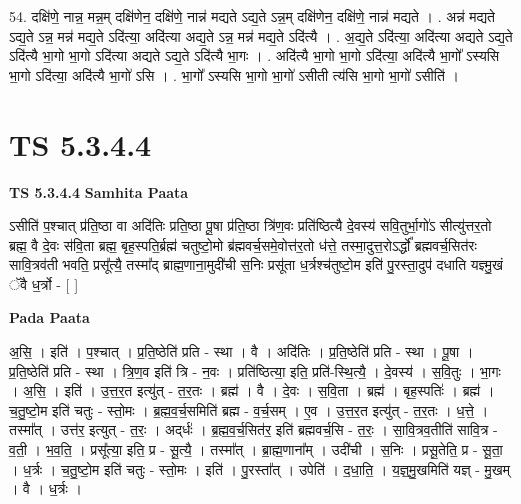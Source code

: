 \documentclass[17pt]{extarticle}
\begin{document}
54. दक्षि॑णे॒ नान्न॒ मन्न॒म् दक्षि॑णेन॒ दक्षि॑णे॒ नान्न॑ मद्यते ऽद्य॒ते ऽन्न॒म् दक्षि॑णेन॒ दक्षि॑णे॒ नान्न॑ मद्यते । . अन्न॑ मद्यते ऽद्य॒ते ऽन्न॒ मन्न॑ मद्य॒ते ऽदि॑त्या॒ अदि॑त्या अद्य॒ते ऽन्न॒ मन्न॑ मद्य॒ते ऽदि॑त्यै । . अ॒द्य॒ते ऽदि॑त्या॒ अदि॑त्या अद्यते ऽद्य॒ते ऽदि॑त्यै भा॒गो भा॒गो ऽदि॑त्या अद्यते ऽद्य॒ते ऽदि॑त्यै भा॒गः । . अदि॑त्यै भा॒गो भा॒गो ऽदि॑त्या॒ अदि॑त्यै भा॒गो᳚ ऽस्यसि भा॒गो ऽदि॑त्या॒ अदि॑त्यै भा॒गो॑ ऽसि । . भा॒गो᳚ ऽस्यसि भा॒गो भा॒गो॑ ऽसीती त्य॑सि भा॒गो भा॒गो॑ ऽसीति॑ । \newline
\pagebreak
{}

\section{ TS 5.3.4.4 }

\textbf{TS 5.3.4.4 } \newline
\textbf{Samhita Paata} \newline

ऽसीति॑ प॒श्चात् प्र॑ति॒ष्ठा वा अदि॑तिः प्रति॒ष्ठा पू॒षा प्र॑ति॒ष्ठा त्रि॑ण॒वः प्रति॑ष्ठित्यै दे॒वस्य॑ सवि॒तुर्भा॒गो॑ऽ सीत्यु॑त्तर॒तो ब्रह्म॒ वै दे॒वः स॑वि॒ता ब्रह्म॒ बृह॒स्पति॒र्ब्रह्म॑ चतुष्टो॒मो ब्र॑ह्मवर्च॒समे॒वोत्त॑र॒तो ध॑त्ते॒ तस्मा॒दुत्त॒रोऽर्द्धो᳚ ब्रह्मवर्च॒सित॑रः सावि॒त्रव॑ती भवति॒ प्रसू᳚त्यै॒ तस्मा᳚द् ब्राह्म॒णाना॒मुदी॑ची स॒निः प्रसू॑ता ध॒र्त्रश्च॑तुष्टो॒म इति॑ पु॒रस्ता॒दुप॑ दधाति यज्ञ्मु॒खं ॅवै ध॒र्त्रो - [  ] \newline

\textbf{Pada Paata} \newline

अ॒सि॒ । इति॑ । प॒श्चात् । प्र॒ति॒ष्ठेति॑ प्रति - स्था । वै । अदि॑तिः । प्र॒ति॒ष्ठेति॑ प्रति - स्था । पू॒षा । प्र॒ति॒ष्ठेति॑ प्रति - स्था । त्रि॒ण॒व इति॑ त्रि - न॒वः । प्रति॑ष्ठित्या॒ इति॒ प्रति॑-स्थि॒त्यै॒ । दे॒वस्य॑ । स॒वि॒तुः । भा॒गः । अ॒सि॒ । इति॑ । उ॒त्त॒र॒त इत्यु॑त् - त॒र॒तः । ब्रह्म॑ । वै । दे॒वः । स॒वि॒ता । ब्रह्म॑ । बृह॒स्पतिः॑ । ब्रह्म॑ । च॒तु॒ष्टो॒म इति॑ चतुः - स्तो॒मः । ब्र॒ह्म॒व॒र्च॒समिति॑ ब्रह्म - व॒र्च॒सम् । ए॒व । उ॒त्त॒र॒त इत्यु॑त् - त॒र॒तः । ध॒त्ते॒ । तस्मा᳚त् । उत्त॑र॒ इत्युत् - त॒रः॒ । अद्‌र्धः॑ । ब्र॒ह्म॒व॒र्च॒सित॑र॒ इति॑ ब्रह्मवर्च॒सि - त॒रः॒ । सा॒वि॒त्रव॒तीति॑ सावि॒त्र - व॒ती॒ । भ॒व॒ति॒ । प्रसू᳚त्या॒ इति॒ प्र - सू॒त्यै॒ । तस्मा᳚त् । ब्रा॒ह्म॒णाना᳚म् । उदी॑ची । स॒निः । प्रसू॒तेति॒ प्र - सू॒ता॒ । ध॒र्त्रः । च॒तु॒ष्टो॒म इति॑ चतुः - स्तो॒मः । इति॑ । पु॒रस्ता᳚त् । उपेति॑ । द॒धा॒ति॒ । य॒ज्ञ्॒मु॒खमिति॑ यज्ञ् - मु॒खम् । वै । ध॒र्त्रः ।  \newline
\end{document}

